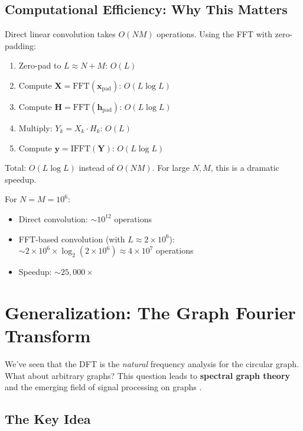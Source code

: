 \begin{notechapter}
\subsection{Computational Efficiency: Why This Matters}

Direct linear convolution takes $O(NM)$ operations. Using the FFT with 
zero-padding:

\begin{enumerate}
\item Zero-pad to $L \approx N+M$: $O(L)$
\item Compute $\mathbf{X} = \text{FFT}(\mathbf{x}_{\text{pad}})$: $O(L \log L)$
\item Compute $\mathbf{H} = \text{FFT}(\mathbf{h}_{\text{pad}})$: $O(L \log L)$
\item Multiply: $Y_k = X_k \cdot H_k$: $O(L)$
\item Compute $\mathbf{y} = \text{IFFT}(\mathbf{Y})$: $O(L \log L)$
\end{enumerate}

Total: $O(L \log L)$ instead of $O(NM)$. For large $N, M$, this is a 
dramatic speedup.

\begin{example}
For $N = M = 10^6$:
\begin{itemize}
\item Direct convolution: $\sim 10^{12}$ operations
\item FFT-based convolution (with $L \approx 2\times10^6$): 
      $\sim 2\times10^6 \times \log_2(2\times10^6) \approx 4\times10^7$ 
      operations
\item Speedup: $\sim 25,000\times$
\end{itemize}
\end{example}

\section{Generalization: The Graph Fourier Transform}

We've seen that the DFT is the \textit{natural} frequency analysis for the 
circular graph. What about arbitrary graphs? This question leads to 
\textbf{spectral graph theory} \cite{dft-to-gnn:chung1997spectral} and the emerging 
field of signal processing on graphs \cite{dft-to-gnn:shuman2013emerging}.

\subsection{The Key Idea}


\end{notechapter}
